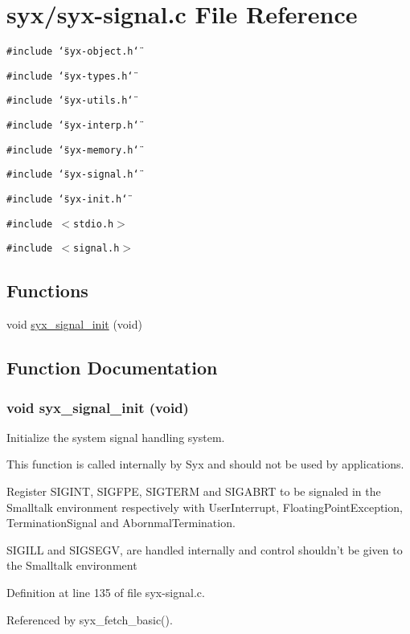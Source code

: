 \hypertarget{syx-signal_8c}{
\section{syx/syx-signal.c File Reference}
\label{syx-signal_8c}
}
{\tt \#include \char`\"{}syx-object.h\char`\"{}}\par
{\tt \#include \char`\"{}syx-types.h\char`\"{}}\par
{\tt \#include \char`\"{}syx-utils.h\char`\"{}}\par
{\tt \#include \char`\"{}syx-interp.h\char`\"{}}\par
{\tt \#include \char`\"{}syx-memory.h\char`\"{}}\par
{\tt \#include \char`\"{}syx-signal.h\char`\"{}}\par
{\tt \#include \char`\"{}syx-init.h\char`\"{}}\par
{\tt \#include $<$stdio.h$>$}\par
{\tt \#include $<$signal.h$>$}\par
\subsection*{Functions}
\begin{CompactItemize}
\item 
void \hyperlink{syx-signal_8c_e7f3ade974cc7da728cc757db2e1f64d}{syx\_\-signal\_\-init} (void)
\end{CompactItemize}


\subsection{Function Documentation}
\hypertarget{syx-signal_8c_e7f3ade974cc7da728cc757db2e1f64d}{
\subsubsection{\setlength{\rightskip}{0pt plus 5cm}void syx\_\-signal\_\-init (void)}}
\label{syx-signal_8c_e7f3ade974cc7da728cc757db2e1f64d}


Initialize the system signal handling system.

This function is called internally by Syx and should not be used by applications.

Register SIGINT, SIGFPE, SIGTERM and SIGABRT to be signaled in the Smalltalk environment respectively with UserInterrupt, FloatingPointException, TerminationSignal and AbornmalTermination.

SIGILL and SIGSEGV, are handled internally and control shouldn't be given to the Smalltalk environment 

Definition at line 135 of file syx-signal.c.

Referenced by syx\_\-fetch\_\-basic().